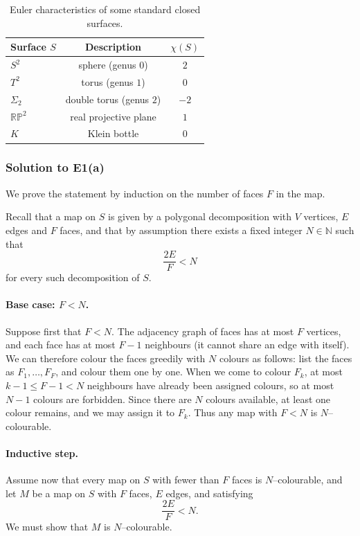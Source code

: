\documentclass[12pt,a4paper]{article}
\theoremstyle{plain}
\theoremstyle{definition}      %
\begin{document}
	\begin{table}[h]
		\centering
		\begin{tabular}{lcc}
			\hline
			Surface $S$ & Description & $\chi(S)$ \\
			\hline
			$S^2$ & sphere (genus $0$)          & $2$ \\
			$T^2$ & torus (genus $1$)           & $0$ \\
			$\Sigma_2$ & double torus (genus $2$) & $-2$ \\
			$\mathbb{RP}^2$ & real projective plane & $1$ \\
			$K$ & Klein bottle                  & $0$ \\
			\hline
		\end{tabular}
		\caption{Euler characteristics of some standard closed surfaces.}
		\label{tab:euler-surfaces}
	\end{table}
	
	
	\subsubsection*{Solution to E1(a)}
	
	We prove the statement by induction on the number of faces $F$ in the map.
	
	Recall that a map on $S$ is given by a polygonal decomposition with $V$
	vertices, $E$ edges and $F$ faces, and that by assumption there exists a
	fixed integer $N \in \mathbb{N}$ such that
	\[
	\frac{2E}{F} < N
	\]
	for every such decomposition of $S$.
	
	\paragraph{Base case: $F < N$.}
	Suppose first that $F < N$.
	The adjacency graph of faces has at most $F$ vertices, and each face has
	at most $F-1$ neighbours (it cannot share an edge with itself).
	We can therefore colour the faces greedily with $N$ colours as follows:
	list the faces as $F_1,\dots,F_F$, and colour them one by one.
	When we come to colour $F_k$, at most $k-1 \le F-1 < N$ neighbours have
	already been assigned colours, so at most $N-1$ colours are forbidden.
	Since there are $N$ colours available, at least one colour remains,
	and we may assign it to $F_k$.
	Thus any map with $F < N$ is $N$--colourable.
	
	\paragraph{Inductive step.}
	Assume now that every map on $S$ with fewer than $F$ faces is
	$N$--colourable, and let $M$ be a map on $S$ with $F$ faces, $E$ edges,
	and satisfying
	\[
	\frac{2E}{F} < N.
	\]
	We must show that $M$ is $N$--colourable.
	
\end{document}
